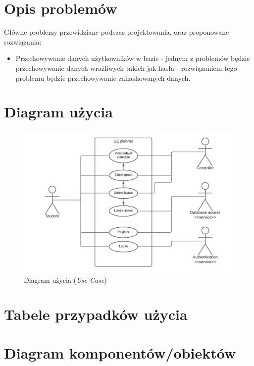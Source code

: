 \documentclass[a4paper,11pt]{uzreport}
\begin{document}
\section{Opis problemów}
	Główne problemy przewidziane podczas projektowania, oraz proponowane rozwiązania:

	\begin{itemize}[leftmargin=0.5in]
            
		\item Przechowywanie danych użytkowników w bazie - jednym z problemów będzie przechowywanie danych wrażliwych takich jak hasła - 			 			rozwiązaniem tego problemu będzie przechowywanie zahashowanych danych.
                
 	\end{itemize}

\section{Diagram użycia}
    \begin{figure}[ht!]
        \centering
        \includegraphics[width=6in]{pictures/use_case.png}
        \caption{Diagram użycia (\textit{Use Case})}
        \label{fig3}
     \end{figure}

\section{Tabele przypadków użycia}



\section{Diagram komponentów/obiektów}
\end{document}
